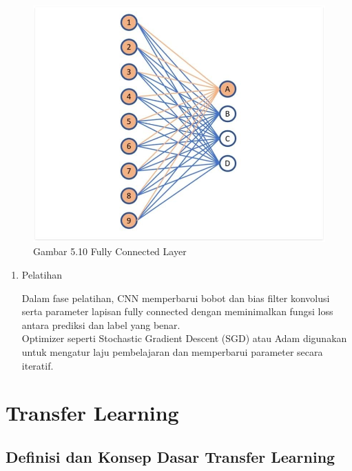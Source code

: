 \documentclass[
  letterpaper,
  DIV=11,
  numbers=noendperiod]{scrreprt}
\begin{document}
\begin{figure}

{\centering \includegraphics{Asset/fullyconnectedLayer.jpg}

}

\caption{Gambar 5.10 Fully Connected Layer}

\end{figure}

\begin{enumerate}
\def\labelenumi{\alph{enumi})}
\setcounter{enumi}{4}
\item
  Pelatihan

  Dalam fase pelatihan, CNN memperbarui bobot dan bias filter konvolusi
  serta parameter lapisan fully connected dengan meminimalkan fungsi
  loss antara prediksi dan label yang benar.\\
  Optimizer seperti Stochastic Gradient Descent (SGD) atau Adam
  digunakan untuk mengatur laju pembelajaran dan memperbarui parameter
  secara iteratif.
\end{enumerate}

\hypertarget{transfer-learning}{%
\section*{Transfer Learning}\label{transfer-learning}}


\hypertarget{definisi-dan-konsep-dasar-transfer-learning}{%
\subsection*{Definisi dan Konsep Dasar Transfer
Learning}\label{definisi-dan-konsep-dasar-transfer-learning}}
\end{document}
